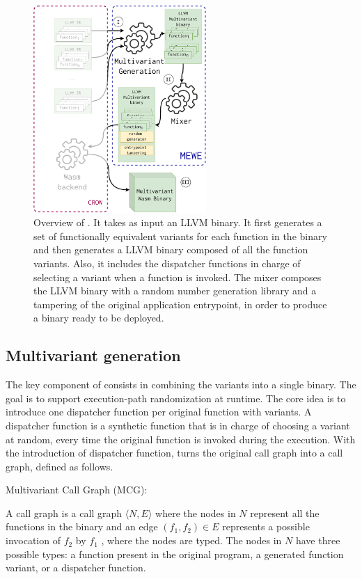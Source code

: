 \begin{figure}
  \centering
  \includegraphics[height=3.1in]{diagrams/MEWE.pdf}
  \caption{Overview of \tool. It takes as input an LLVM binary. It first generates a set of functionally equivalent variants for each function in the binary and then generates a LLVM binary composed of all the function variants. Also, it includes the dispatcher functions in charge of selecting a variant when a function is invoked. The \tool mixer composes the LLVM binary with a random number generation library and a tampering of the original application entrypoint, in order to produce a \wasm {}binary ready to be deployed. }
  \label{workflow}
\end{figure}


\subsection*{Multivariant generation}

The key component of \tool consists in combining the variants into a single binary.
The goal is to support execution-path randomization at runtime.
The core idea is to introduce one dispatcher function per original function with variants.
A dispatcher function is a synthetic function that is in charge of choosing a variant at random, every time the original function is invoked during the execution.
With the introduction of dispatcher function,  \tool turns the original call graph into a call graph, defined as follows. 

\begin{definition}{Multivariant Call Graph (MCG):}\label{def:EP}
  
    A call graph is a call graph $\langle N,E \rangle$ where the nodes in $N$ represent all the functions in the binary and an edge $(f_1,f_2) \in E$ represents a possible invocation of $f_2$ by $f_1$  \cite{ryder1979}, where the nodes are typed. The nodes in $N$ have three possible types: a function present in the original program,  a generated function variant, or a dispatcher function.
\end{definition}


